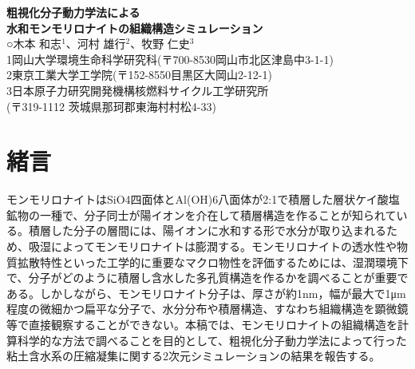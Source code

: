 ﻿\documentclass[11pt,a4j]{jarticle}
\newlength{\minitwocolumn}
\begin{document}
\newcommand{\fat}[1]{\mbox{\boldmath $#1$}}
\newcommand{\D}{\partial}
\newcommand{\w}{\omega}
\newcommand{\ga}{\alpha}
\newcommand{\gb}{\beta}
\newcommand{\gx}{\xi}
\newcommand{\gz}{\zeta}
\newcommand{\vhat}[1]{\hat{\fat{#1}}}
\newcommand{\spc}{\vspace{0.7\baselineskip}}
\newcommand{\halfspc}{\vspace{0.3\baselineskip}}

\newcommand{\twofig}[2]
 {
   \begin{figure}[h]
     \begin{minipage}[t]{\minitwocolumn}
         \begin{center}   #1
         \end{center}
     \end{minipage}
         \hspace{\columnsep}
     \begin{minipage}[t]{\minitwocolumn}
         \begin{center} #2
         \end{center}
     \end{minipage}
   \end{figure}
 }
\vspace{2mm}
\begin{center}
{\LARGE \bf 
粗視化分子動力学法による\\水和モンモリロナイトの組織構造シミュレーション\\
} 
 ○木本 和志$^1$、河村 雄行$^2$、牧野 仁史$^3$\\
1岡山大学環境生命科学研究科(〒700-8530岡山市北区津島中3-1-1)\\
2東京工業大学工学院(〒152-8550目黒区大岡山2-12-1)\\
3日本原子力研究開発機構核燃料サイクル工学研究所\\
(〒319-1112 茨城県那珂郡東海村村松4-33)
\end{center}
\section{緒言}
モンモリロナイトはSiO4四面体とAl(OH)6八面体が2:1で積層した層状ケイ酸塩鉱物の一種で、分子同士が陽イオンを介在して積層構造を作ることが知られている。積層した分子の層間には、陽イオンに水和する形で水分が取り込まれるため、吸湿によってモンモリロナイトは膨潤する。モンモリロナイトの透水性や物質拡散特性といった工学的に重要なマクロ物性を評価するためには、湿潤環境下で、分子がどのように積層し含水した多孔質構造を作るかを調べることが重要である。しかしながら、モンモリロナイト分子は、厚さが約1nm，幅が最大で1μm程度の微細かつ扁平な分子で、水分分布や積層構造、すなわち組織構造を顕微鏡等で直接観察することができない。本稿では、モンモリロナイトの組織構造を計算科学的な方法で調べることを目的として、粗視化分子動力学法によって行った粘土含水系の圧縮凝集に関する2次元シミュレーションの結果を報告する。
\end{document}
